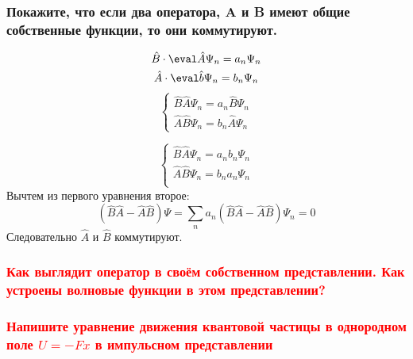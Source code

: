 \subsubsection{Покажите, что если два оператора, A и B имеют общие собственные функции, то
они коммутируют.}


\begin{gather*}
	\hat{B}\cdot\eval \hat{A}\Psi_n=a_n\Psi_n \\
	\hat{A}\cdot\eval \hat{b}\Psi_n=b_n\Psi_n
\end{gather*}
\begin{equation*}
\begin{cases}
	\hat{B}\hat{A}\Psi_n=a_n\hat{B}\Psi_n \\
	\hat{A}\hat{B}\Psi_n=b_n\hat{A}\Psi_n
\end{cases}
\end{equation*}

\begin{equation*}
\begin{cases}
	\hat{B}\hat{A}\Psi_n=a_nb_n\Psi_n \\
	\hat{A}\hat{B}\Psi_n=b_na_n\Psi_n \\
\end{cases}
\end{equation*}
Вычтем из первого уравнения второе:
\begin{equation*}
	(\hat{B}\hat{A}-\hat{A}\hat{B})\Psi=\sum\limits_n a_n (\hat{B}\hat{A}-\hat{A}\hat{B})\Psi_n=0
\end{equation*}
Следовательно $\hat{A}$  и $\hat{B}$ коммутируют.

\subsubsection{\textcolor{red}{Как выглядит оператор в своём собственном представлении. Как устроены волновые функции в этом представлении?}}

\subsubsection{\textcolor{red}{Напишите уравнение движения квантовой частицы в однородном поле $U=-Fx$ в импульсном представлении}}